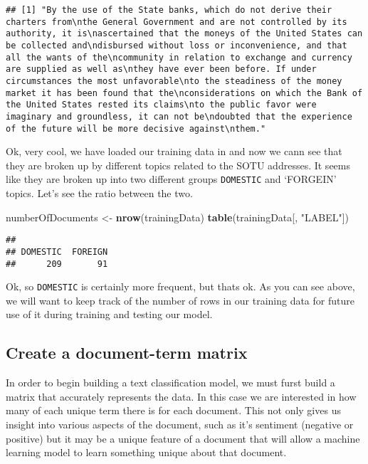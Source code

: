 \documentclass[
]{article}
\newenvironment{Shaded}{\begin{snugshade}}{\end{snugshade}}
\newcommand{\KeywordTok}[1]{\textcolor[rgb]{0.13,0.29,0.53}{\textbf{#1}}}
\newcommand{\NormalTok}[1]{#1}
\newcommand{\StringTok}[1]{\textcolor[rgb]{0.31,0.60,0.02}{#1}}
\begin{document}
\begin{verbatim}
## [1] "By the use of the State banks, which do not derive their charters from\nthe General Government and are not controlled by its authority, it is\nascertained that the moneys of the United States can be collected and\ndisbursed without loss or inconvenience, and that all the wants of the\ncommunity in relation to exchange and currency are supplied as well as\nthey have ever been before. If under circumstances the most unfavorable\nto the steadiness of the money market it has been found that the\nconsiderations on which the Bank of the United States rested its claims\nto the public favor were imaginary and groundless, it can not be\ndoubted that the experience of the future will be more decisive against\nthem."
\end{verbatim}

Ok, very cool, we have loaded our training data in and now we cann see
that they are broken up by different topics related to the SOTU
addresses. It seems like they are broken up into two different groups
\texttt{DOMESTIC} and `FORGEIN' topics. Let's see the ratio between the
two.

\begin{Shaded}
\begin{Highlighting}[]
\NormalTok{numberOfDocuments <-}\StringTok{ }\KeywordTok{nrow}\NormalTok{(trainingData)}
\KeywordTok{table}\NormalTok{(trainingData[, }\StringTok{"LABEL"}\NormalTok{])}
\end{Highlighting}
\end{Shaded}

\begin{verbatim}
## 
## DOMESTIC  FOREIGN 
##      209       91
\end{verbatim}

Ok, so \texttt{DOMESTIC} is certainly more frequent, but thats ok. As
you can see above, we will want to keep track of the number of rows in
our training data for future use of it during training and testing our
model.

\hypertarget{create-a-document-term-matrix}{%
\subsection{Create a document-term
matrix}\label{create-a-document-term-matrix}}

In order to begin building a text classification model, we must furst
build a matrix that accurately represents the data. In this case we are
interested in how many of each unique term there is for each document.
This not only gives us insight into various aspects of the document,
such as it's sentiment (negative or positive) but it may be a unique
feature of a document that will allow a machine learning model to learn
something unique about that document.
\end{document}
